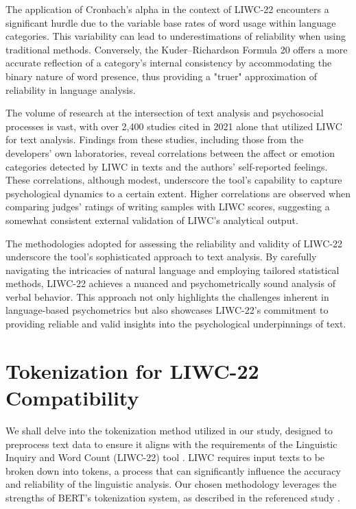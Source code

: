 The application of Cronbach’s alpha in the context of LIWC-22 encounters a significant hurdle due to the variable base rates of word usage within language categories. This variability can lead to underestimations of reliability when using traditional methods. Conversely, the Kuder–Richardson Formula 20 offers a more accurate reflection of a category's internal consistency by accommodating the binary nature of word presence, thus providing a "truer" approximation of reliability in language analysis.

The volume of research at the intersection of text analysis and psychosocial processes is vast, with over 2,400 studies cited in 2021 alone that utilized LIWC for text analysis. Findings from these studies, including those from the developers' own laboratories, reveal correlations between the affect or emotion categories detected by LIWC in texts and the authors' self-reported feelings. These correlations, although modest, underscore the tool's capability to capture psychological dynamics to a certain extent. Higher correlations are observed when comparing judges' ratings of writing samples with LIWC scores, suggesting a somewhat consistent external validation of LIWC's analytical output\cite{boyd2022development}.

The methodologies adopted for assessing the reliability and validity of LIWC-22 underscore the tool's sophisticated approach to text analysis. By carefully navigating the intricacies of natural language and employing tailored statistical methods, LIWC-22 achieves a nuanced and psychometrically sound analysis of verbal behavior. This approach not only highlights the challenges inherent in language-based psychometrics but also showcases LIWC-22's commitment to providing reliable and valid insights into the psychological underpinnings of text.

\section{Tokenization for LIWC-22 Compatibility}

\quad We shall delve into the tokenization method utilized in our study, designed to preprocess text data to ensure it aligns with the requirements of the Linguistic Inquiry and Word Count (LIWC-22) tool \cite{boyd2022development}. LIWC requires input texts to be broken down into tokens, a process that can significantly influence the accuracy and reliability of the linguistic analysis. Our chosen methodology leverages the strengths of BERT's tokenization system, as described in the referenced study \cite{bertTokenizerEnglish}.

